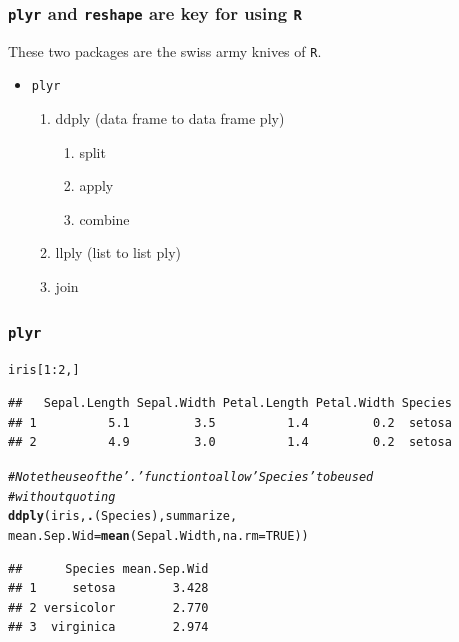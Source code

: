 \documentclass{beamer}\usepackage[]{graphicx}\usepackage[]{color}
\makeatletter
\newcommand{\hlnum}[1]{\textcolor[rgb]{0.686,0.059,0.569}{#1}}%
\newcommand{\hlcom}[1]{\textcolor[rgb]{0.678,0.584,0.686}{\textit{#1}}}%
\newcommand{\hlopt}[1]{\textcolor[rgb]{0,0,0}{#1}}%
\newcommand{\hlstd}[1]{\textcolor[rgb]{0.345,0.345,0.345}{#1}}%
\newcommand{\hlkwc}[1]{\textcolor[rgb]{0.333,0.667,0.333}{#1}}%
\newcommand{\hlkwd}[1]{\textcolor[rgb]{0.737,0.353,0.396}{\textbf{#1}}}%
\newenvironment{kframe}{%
 \def\at@end@of@kframe{}%
 \ifinner\ifhmode%
  \def\at@end@of@kframe{\end{minipage}}%
  \begin{minipage}{\columnwidth}%
 \fi\fi%
 \def\FrameCommand##1{\hskip\@totalleftmargin \hskip-\fboxsep
 \colorbox{shadecolor}{##1}\hskip-\fboxsep
     \hskip-\linewidth \hskip-\@totalleftmargin \hskip\columnwidth}%
 \MakeFramed {\advance\hsize-\width
   \@totalleftmargin\z@ \linewidth\hsize
   \@setminipage}}%
 {\par\unskip\endMakeFramed%
 \at@end@of@kframe}
\newenvironment{knitrout}{}{} %
\makeatother
\begin{document}
\begin{frame}[fragile]
\frametitle{\texttt{plyr} and \texttt{reshape} are key for using \texttt{R}}
These two packages are the swiss army knives of \texttt{R}.
\begin{itemize}
\item \texttt{plyr}
    \begin{enumerate}
    \item ddply (data frame to data frame ply)
        \begin{enumerate}
        \item split
        \item apply
        \item combine
        \end{enumerate}
    \item llply (list to list ply)
    \item join
    \end{enumerate}
\end{itemize}
\end{frame}


\begin{frame}[fragile]
\frametitle{\texttt{plyr}}
\begin{knitrout}\footnotesize
{}\color{fgcolor}\begin{kframe}
\begin{alltt}
\hlstd{iris[}\hlnum{1}\hlopt{:}\hlnum{2}\hlstd{, ]}
\end{alltt}
\begin{verbatim}
##   Sepal.Length Sepal.Width Petal.Length Petal.Width Species
## 1          5.1         3.5          1.4         0.2  setosa
## 2          4.9         3.0          1.4         0.2  setosa
\end{verbatim}
\begin{alltt}
\hlcom{# Note the use of the '.' function to allow 'Species' to be used }
\hlcom{# without quoting}
\hlkwd{ddply}\hlstd{(iris,} \hlkwd{.}\hlstd{(Species), summarize,}
      \hlkwc{mean.Sep.Wid} \hlstd{=} \hlkwd{mean}\hlstd{(Sepal.Width,} \hlkwc{na.rm} \hlstd{=} \hlnum{TRUE}\hlstd{))}
\end{alltt}
\begin{verbatim}
##      Species mean.Sep.Wid
## 1     setosa        3.428
## 2 versicolor        2.770
## 3  virginica        2.974
\end{verbatim}
\end{kframe}
\end{knitrout}
\end{frame}
\end{document}
